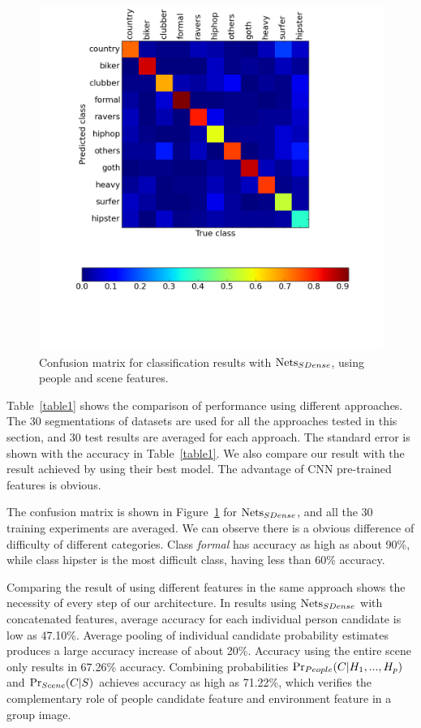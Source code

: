 \documentclass[10pt,twocolumn,letterpaper]{article}
\begin{document}
\begin{figure}[!t]
\begin{center}
\includegraphics[width=0.8\linewidth]{confusion.png}
\end{center}
\caption{Confusion matrix for classification results with  $\textup{Nets}_{SDense}$,  using people and scene features.}
\label{confusion}
\end{figure}


Table~\ref{table1} shows the comparison of performance using different approaches. The 30 segmentations of datasets are used for all the approaches tested in this section, and 30 test results are averaged for each approach. The standard error is shown with the accuracy in Table~\ref{table1}. We also compare our result with the result achieved by \cite{urbantribe2} using their best model. The advantage of CNN pre-trained features is obvious. 

The confusion matrix is shown in Figure~\ref{confusion} for $\textup{Nets}_{SDense}$, and all the 30 training experiments are averaged. We can observe there is a obvious difference of difficulty of different categories. Class \emph{formal} has accuracy as high as about 90\%, while class hipster is the most difficult class, having less than 60\% accuracy.

Comparing the result of using different features in the same approach shows the necessity of every step of our architecture. In results using  $\textup{Nets}_{SDense}$ with concatenated features, average accuracy for each individual person candidate is low as 47.10\%. Average pooling of individual candidate probability estimates produces a large accuracy increase of about 20\%. Accuracy using the entire scene only results in 67.26\% accuracy. Combining probabilities $\textup{Pr}_{People}(C|H_{1}, ..., H_{p})$ and $\textup{Pr}_{Scene}(C|S)$ achieves accuracy as high as 71.22\%, which verifies the complementary role of people candidate feature and environment feature in a group image. 
\end{document}
